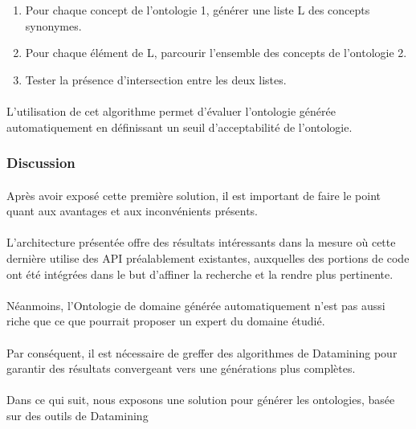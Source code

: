\documentclass[12pt, a4paper, oneside]{book}
\begin{document}
\begin{enumerate}

\item Pour chaque concept de l'ontologie 1, générer une liste L des concepts synonymes.
\item Pour chaque élément de L, parcourir l'ensemble des concepts de l'ontologie 2.
\item Tester la présence d'intersection entre les deux listes.

\end{enumerate}

\paragraph{}

L'utilisation de cet algorithme permet d'évaluer l'ontologie générée automatiquement en définissant un seuil d'acceptabilité de l'ontologie.

\subsubsection{Discussion}
\paragraph{}
Après avoir exposé cette première solution, il est important de faire le point quant aux avantages et aux inconvénients présents. 
\paragraph{}
L'architecture présentée offre des résultats intéressants dans la mesure où cette dernière utilise des API préalablement existantes, auxquelles des portions de code ont été intégrées dans le but d'affiner la recherche et la rendre plus pertinente.
\paragraph{}
Néanmoins, l'Ontologie de domaine générée automatiquement n'est pas aussi riche que ce que pourrait proposer un expert du domaine étudié.
\paragraph{}
Par conséquent, il est nécessaire de greffer des algorithmes de Datamining pour garantir des résultats convergeant vers une générations plus complètes. 
\paragraph{}
Dans ce qui suit, nous exposons une solution pour générer les ontologies, basée sur des outils de Datamining
\end{document}
